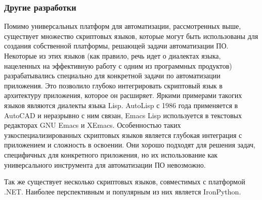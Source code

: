 \subsubsection{Другие разработки}

Помимо универсальных платформ для автоматизации, рассмотренных выше, существует множество скриптовых языков, которые могут быть использованы для создания собственной платформы, решающей задачи автоматизации ПО. Некоторые из этих языков (как правило, речь идет о диалектах языка, нацеленных на эффективную работу с одним из программных продуктов) разрабатывались специально для конкретной задачи по автоматизации приложения. Это позволило глубоко интегрировать скриптовый язык в архитектуру приложения, которое он расширяет. Яркими примерами такогих языков являются диалекты языка Lisp. AutoLisp с 1986 года применяется в AutoCAD и неразрывно с ним связан, Emacs Lisp используется в текстовых редакторах GNU Emacs и XEmacs. Особенностью таких узкоспециализированных скриптовых языков является глубокая интеграция с приложением и сложность в освоении. Они хорошо подходят для решения задач, специфичных для конкретного приложения, но их использование как универсального инструмента для автоматизации ПО невозможно.

Так же существует несколько скриптовых языков, совместимых с платформой .NET. Наиболее перспективным и популярным из них является IronPython.

